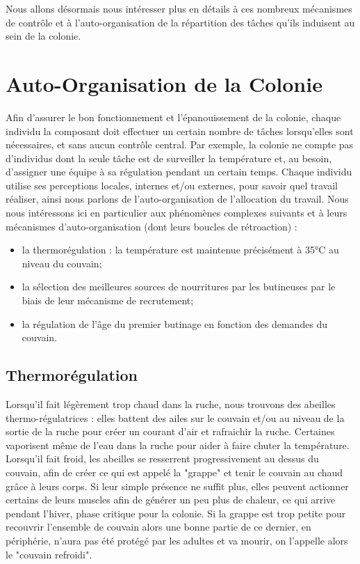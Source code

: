 			Nous allons désormais nous intéresser plus en détails à ces nombreux mécanismes de contrôle et à l'auto-organisation de la répartition des tâches qu'ils induisent au sein de la colonie.
			
		\section{Auto-Organisation de la Colonie}
			Afin d'assurer le bon fonctionnement et l'épanouissement de la colonie, chaque individu la composant doit effectuer un certain nombre de tâches lorsqu'elles sont nécessaires, et sans aucun contrôle central. Par exemple, la colonie ne compte pas d'individus dont la seule tâche est de surveiller la température et, au besoin, d'assigner une équipe à sa régulation pendant un certain temps. Chaque individu utilise ses perceptions locales, internes et/ou externes, pour savoir quel travail réaliser, ainsi nous parlons de l'auto-organisation de l'allocation du travail. Nous nous intéressons ici en particulier aux phénomènes complexes suivants et à leurs mécanismes d'auto-organisation (dont leurs boucles de rétroaction) :
			
			
			\begin{itemize}
				\item la thermorégulation : la température est maintenue précisément à 35°C au niveau du couvain;
				\item la sélection des meilleures sources de nourritures par les butineuses par le biais de leur mécanisme de recrutement;
				\item la régulation de l'âge du premier butinage en fonction des demandes du couvain.
			\end{itemize}

			\subsection{Thermorégulation}	
			
			Lorsqu'il fait légèrement trop chaud dans la ruche, nous trouvons des abeilles thermo-régulatrices : elles battent des ailes sur le couvain et/ou au niveau de la sortie de la ruche pour créer un courant d'air et rafraichir la ruche. Certaines vaporisent même de l'eau dans la ruche pour aider à faire chuter la température. Lorsqu'il fait froid, les abeilles se resserrent progressivement au dessus du couvain, afin de créer ce qui est appelé la "grappe" et tenir le couvain au chaud grâce à leurs corps. Si leur simple présence ne suffit plus, elles peuvent actionner certains de leurs muscles afin de générer un peu plus de chaleur, ce qui arrive pendant l'hiver, phase critique pour la colonie. Si la grappe est trop petite pour recouvrir l'ensemble de couvain alors une bonne partie de ce dernier, en périphérie, n'aura pas été protégé par les adultes et va mourir, on l'appelle alors le "couvain refroidi".
					
